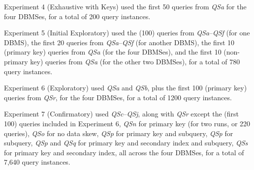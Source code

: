 \documentclass[prodmode,acmtods]{acmsmall}
\begin{document}
Experiment 4 (Exhaustive with Keys) used the first 50 queries from {\em QSa}
for the four DBMSes, for a total of 200  query instances.

Experiment 5 (Initial Exploratory) used the (100) queries from {\em
  QSa}--{\em QSf} (for
one DBMS), the first 20 queries from {\em QSa}--{\em QSf} (for another DBMS), the first
10 (primary key) queries from {\em QSa} (for the four DBMSes), and the first 10
(non-primary key) queries from {\em QSa} (for the other two DBMSes), for a total of 780 query instances.

Experiment 6 (Exploratory) used {\em QSa} and {\em QSb}, plus the first 100 (primary
key) queries from {\em QSr}, for the four DBMSes, for a total of 1200 query
instances.

Experiment 7 (Confirmatory) used {\em QSc}--{\em QSj},
along with {\em QSr} except the (first 100) queries included in Experiment 6,
{\em QSn} for primary key (for two runs, or 220 queries),
{\em QSo} for no data skew,
{\em QSp} for primary key and subquery,
{\em QSp} for subquery,
{\em QSp} and {\em QSq} for primary key and secondary index and subquery,
{\em QSs} for primary key and secondary index,
all across the four DBMSes, for a total of 7,640 query instances.

\end{document}
